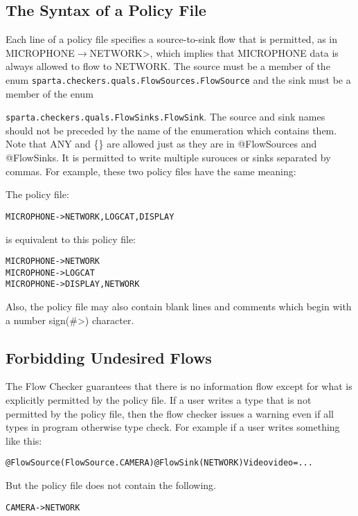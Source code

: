 \subsection{The Syntax of a Policy File}

Each line of a policy file specifies a source-to-sink flow that is permitted, as in
\<MICROPHONE$\rightarrow$NETWORK>, which implies that
MICROPHONE data is always allowed to flow to NETWORK.  
The source must be a member of the enum
\verb+sparta.checkers.quals.FlowSources.FlowSource+ and the sink must be a
member of the enum 

\noindent\verb+sparta.checkers.quals.FlowSinks.FlowSink+.  The source 
and sink names should not be preceded by the name of the enumeration which contains them.
Note that ANY and \{\} are allowed just as they are in @FlowSources and @FlowSinks.
It is permitted to write multiple surouces or sinks separated by commas. For example,
these two policy files have the same meaning:


 The policy file:
\begin{alltt}
   MICROPHONE -> NETWORK, LOGCAT, DISPLAY
\end{alltt}
is equivalent to this policy file:
\begin{alltt}
   MICROPHONE -> NETWORK
   MICROPHONE -> LOGCAT
   MICROPHONE -> DISPLAY, NETWORK
\end{alltt}

Also, the policy file may also contain blank lines and comments which begin with 
a number sign(\<\#>) character.


\subsection{Forbidding Undesired Flows}
\label{sec:undsiredflows}
The Flow Checker guarantees that there is no information
flow except for what is explicitly permitted by the policy file. If a user writes a type that is
not permitted by the policy file, then the flow checker issues a warning  even if all types in program otherwise type check. For example if a user writes something like this:
\begin{alltt}
@FlowSource(FlowSource.CAMERA) @FlowSink(NETWORK) Video video = ...
\end{alltt}

But the policy file does not contain the following.

\begin{alltt}
CAMERA -> NETWORK
\end{alltt}

